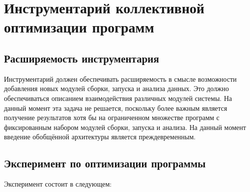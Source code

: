 \section{Инструментарий коллективной оптимизации программ}


\subsection{Расширяемость инструментария}
Инструментарий должен обеспечивать расширяемость в смысле возможности добавления новых модулей сборки, запуска и анализа данных. Это должно обеспечиваться описанием взаимодействия различных модулей системы. На данный момент эта задача не решается, поскольку более важным является получение результатов хотя бы на ограниченном множестве программ с фиксированным набором модулей сборки, запуска и анализа. На данный момент введение обобщённой архитектуры является преждевременным.


\subsection{Эксперимент по оптимизации программы}
Эксперимент состоит в следующем:

